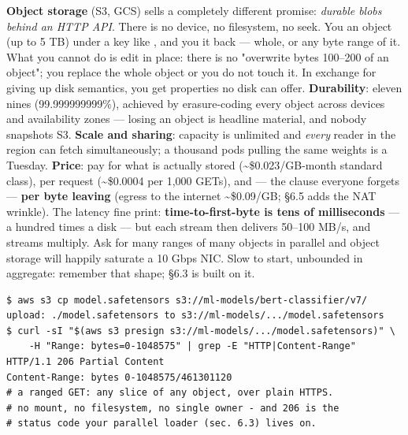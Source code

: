 \textbf{Object storage} (S3, GCS) sells a completely different promise: \textit{durable blobs behind an HTTP API}. There is no device, no filesystem, no seek. You  an object (up to 5 TB) under a key like , and you  it back — whole, or any byte range of it. What you cannot do is edit in place: there is no "overwrite bytes 100–200 of an object"; you replace the whole object or you do not touch it. In exchange for giving up disk semantics, you get properties no disk can offer. \textbf{Durability}: eleven nines (99.999999999\%), achieved by erasure-coding every object across devices and availability zones — losing an object is headline material, and nobody snapshots S3. \textbf{Scale and sharing}: capacity is unlimited and \textit{every} reader in the region can fetch simultaneously; a thousand pods pulling the same weights is a Tuesday. \textbf{Price}: pay for what is actually stored (\textasciitilde{}\$0.023/GB-month standard class), per request (\textasciitilde{}\$0.0004 per 1,000 GETs), and — the clause everyone forgets — \textbf{per byte leaving} (egress to the internet \textasciitilde{}\$0.09/GB; §6.5 adds the NAT wrinkle). The latency fine print: \textbf{time-to-first-byte is tens of milliseconds} — a hundred times a disk — but each stream then delivers 50–100 MB/s, and streams multiply. Ask for many ranges of many objects in parallel and object storage will happily saturate a 10 Gbps NIC. Slow to start, unbounded in aggregate: remember that shape; §6.3 is built on it.

\begin{terminalbox}
\begin{Verbatim}[breaklines=true,breakanywhere=true,fontsize=\small,formatcom=\color{tbbtermfg},codes=\tbbcodeactive]
$ aws s3 cp model.safetensors s3://ml-models/bert-classifier/v7/
upload: ./model.safetensors to s3://ml-models/.../model.safetensors
$ curl -sI "$(aws s3 presign s3://ml-models/.../model.safetensors)" \
    -H "Range: bytes=0-1048575" | grep -E "HTTP|Content-Range"
HTTP/1.1 206 Partial Content
Content-Range: bytes 0-1048575/461301120
# a ranged GET: any slice of any object, over plain HTTPS.
# no mount, no filesystem, no single owner - and 206 is the
# status code your parallel loader (sec. 6.3) lives on.
\end{Verbatim}
\end{terminalbox}

